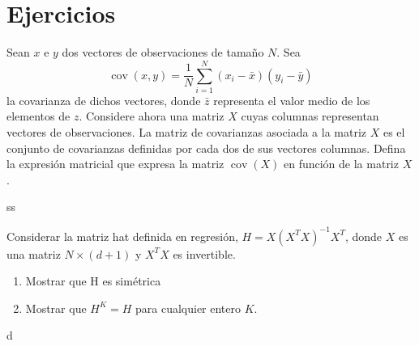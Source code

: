 \documentclass[a4paper, 11pt]{article}
\begin{document}
    \maketitle

    \section{Ejercicios}


      \begin{ejercicio}
        Sean $x$ e $y$ dos vectores de observaciones de tamaño $N$. Sea
        \[
        \operatorname{cov}(x,y)=\frac{1}{N}\sum_{i=1}^N (x_i-\bar{x})(y_i-\bar{y})
        \]
        la covarianza de dichos vectores, donde $\bar{z}$ representa el valor medio de los elementos de $z$. Considere ahora una matriz $X$ cuyas columnas representan vectores de observaciones. La matriz de covarianzas asociada a la matriz $X$ es el conjunto de covarianzas definidas por cada dos de sus vectores columnas. Defina la expresión matricial que expresa la matriz $\operatorname{cov}(X)$ en función de la matriz $X$.
      \end{ejercicio}

      \begin{solucion}
        ss
      \end{solucion}

      \begin{ejercicio}
        Considerar la matriz hat definida en regresión,  $H = X(X^TX)^{-1}X^T$, donde $X$ es una matriz  $N \times (d+1)$ y $X^TX$ es invertible.
        \begin{enumerate}
            \item Mostrar que H es simétrica
            \item Mostrar que $H^K=H$ para cualquier entero $K$.
        \end{enumerate}
      \end{ejercicio}

      \begin{solucion}
        d
      \end{solucion}
\end{document}
